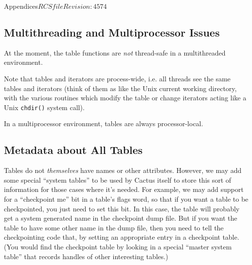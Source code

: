 \begin{cactuspart}{Appendices}{$RCSfile$}{$Revision: 4574 $}

\subsection{Multithreading and Multiprocessor Issues}

At the moment, the table functions are \emph{not} thread-safe
in a multithreaded environment. 

Note that tables and iterators are process-wide, i.e. all
threads see the same tables and iterators (think of them as like the
Unix current working directory, with the various routines which modify
the table or change iterators acting like a Unix \verb|chdir()| system
call).

In a multiprocessor environment, tables are always processor-local.


\subsection{Metadata about All Tables}

Tables do not \emph{themselves} have names or other
attributes.  However, we may add some special
``system tables'' to be used by Cactus itself to store this sort of
information for those cases where it's needed. For example, we may add support for a
``checkpoint me'' bit in a table's flags word, so that if you want a
table to be checkpointed, you just need to set this bit.
In this case, the table will probably get a system generated name in
the checkpoint dump file.  But if you want the table to have some
other name in the dump file, then you need to tell the checkpointing
code that, by setting an appropriate entry in a checkpoint table.
(You would find the checkpoint table by looking in a special
``master system table'' that records handles of other interesting tables.)


\end{cactuspart}
